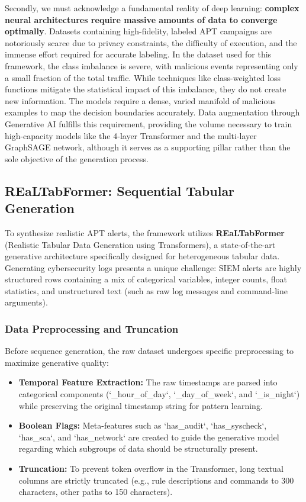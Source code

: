 Secondly, we must acknowledge a fundamental reality of deep learning: \textbf{complex neural architectures require massive amounts of data to converge optimally}. Datasets containing high-fidelity, labeled APT campaigns are notoriously scarce due to privacy constraints, the difficulty of execution, and the immense effort required for accurate labeling. In the dataset used for this framework, the class imbalance is severe, with malicious events representing only a small fraction of the total traffic. While techniques like class-weighted loss functions mitigate the statistical impact of this imbalance, they do not create new information. The models require a dense, varied manifold of malicious examples to map the decision boundaries accurately. Data augmentation through Generative AI fulfills this requirement, providing the volume necessary to train high-capacity models like the 4-layer Transformer and the multi-layer GraphSAGE network, although it serves as a supporting pillar rather than the sole objective of the generation process.

\subsection{REaLTabFormer: Sequential Tabular Generation}
\label{subsec:realtabformer}

To synthesize realistic APT alerts, the framework utilizes \textbf{REaLTabFormer} (Realistic Tabular Data Generation using Transformers), a state-of-the-art generative architecture specifically designed for heterogeneous tabular data. Generating cybersecurity logs presents a unique challenge: SIEM alerts are highly structured rows containing a mix of categorical variables, integer counts, float statistics, and unstructured text (such as raw log messages and command-line arguments).

\subsubsection{Data Preprocessing and Truncation}

Before sequence generation, the raw dataset undergoes specific preprocessing to maximize generative quality:
\begin{itemize}
    \item \textbf{Temporal Feature Extraction:} The raw timestamps are parsed into categorical components (`\_hour\_of\_day`, `\_day\_of\_week`, and `\_is\_night`) while preserving the original timestamp string for pattern learning.
    \item \textbf{Boolean Flags:} Meta-features such as `has\_audit`, `has\_syscheck`, `has\_sca`, and `has\_network` are created to guide the generative model regarding which subgroups of data should be structurally present.
    \item \textbf{Truncation:} To prevent token overflow in the Transformer, long textual columns are strictly truncated (e.g., rule descriptions and commands to 300 characters, other paths to 150 characters).
\end{itemize}

